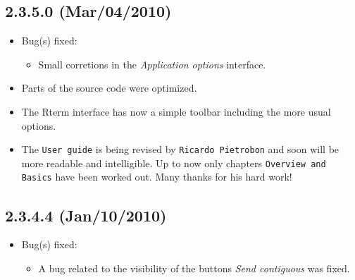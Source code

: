 \subsection{2.3.5.0 (Mar/04/2010)}

\begin{itemize}
  \item Bug(s) fixed:
    \begin{itemize}
      \item Small corretions in the \textit{Application options} interface.
    \end{itemize}
  \item Parts of the source code were optimized.
  \item The Rterm interface has now a simple toolbar including the more usual
    options.
  \item The \texttt{User guide} is being revised by \texttt{Ricardo Pietrobon}
    and soon will be more readable and intelligible. Up to now only chapters
    \texttt{Overview and Basics} have been worked out. Many thanks for his
    hard work!
\end{itemize}


\subsection{2.3.4.4 (Jan/10/2010)}

\begin{itemize}
  \item Bug(s) fixed:
    \begin{itemize}
      \item A bug related to the visibility of the buttons \textit{Send contiguous} was fixed.
    \end{itemize}
\end{itemize}

